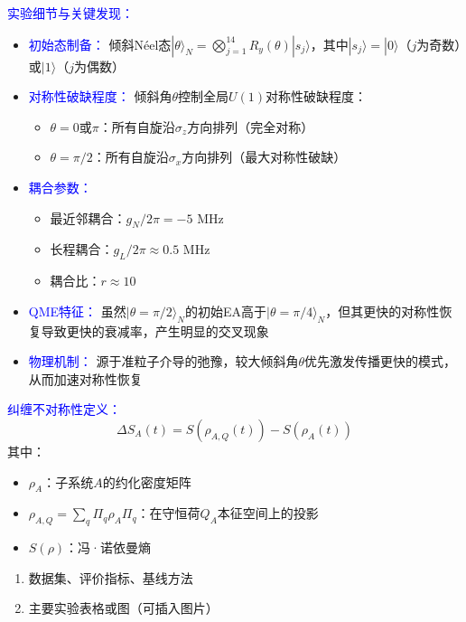 \documentclass[11pt,a4paper]{article}
\begin{document}
\textcolor{blue}{实验细节与关键发现：}
\begin{itemize}
    \item \textcolor{blue}{初始态制备：} 倾斜Néel态$|\theta\rangle_N = \bigotimes_{j=1}^{14} R_y(\theta)|s_j\rangle$，其中$|s_j\rangle = |0\rangle$（$j$为奇数）或$|1\rangle$（$j$为偶数）
    \item \textcolor{blue}{对称性破缺程度：} 倾斜角$\theta$控制全局$U(1)$对称性破缺程度：
    \begin{itemize}
        \item $\theta=0$或$\pi$：所有自旋沿$\sigma_z$方向排列（完全对称）
        \item $\theta=\pi/2$：所有自旋沿$\sigma_x$方向排列（最大对称性破缺）
    \end{itemize}
    \item \textcolor{blue}{耦合参数：} 
    \begin{itemize}
        \item 最近邻耦合：$g_N/2\pi = -5$ MHz
        \item 长程耦合：$g_L/2\pi \approx 0.5$ MHz
        \item 耦合比：$r \approx 10$
    \end{itemize}
    \item \textcolor{blue}{QME特征：} 虽然$|\theta=\pi/2\rangle_N$的初始EA高于$|\theta=\pi/4\rangle_N$，但其更快的对称性恢复导致更快的衰减率，产生明显的交叉现象
    \item \textcolor{blue}{物理机制：} 源于准粒子介导的弛豫，较大倾斜角$\theta$优先激发传播更快的模式，从而加速对称性恢复
\end{itemize}

\textcolor{blue}{纠缠不对称性定义：}
\begin{equation}
\Delta S_A(t) = S(\rho_{A,Q}(t)) - S(\rho_A(t))
\end{equation}
其中：
\begin{itemize}
    \item $\rho_A$：子系统$A$的约化密度矩阵
    \item $\rho_{A,Q} = \sum_q \Pi_q \rho_A \Pi_q$：在守恒荷$Q_A$本征空间上的投影
    \item $S(\rho)$：冯·诺依曼熵
\end{itemize}




\begin{enumerate}
    \item 数据集、评价指标、基线方法
    \item 主要实验表格或图（可插入图片）
\end{enumerate}
\end{document}
